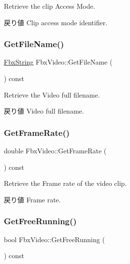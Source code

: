 Retrieve the clip Access Mode. \begin{DoxyReturn}{戻り値}
Clip access mode identifier. 
\end{DoxyReturn}
\mbox{\label{class_fbx_video_a96fc2a11e4e7ca89230389bb55ca5466}} 
\subsubsection{\texorpdfstring{Get\+File\+Name()}{GetFileName()}}
{\footnotesize\ttfamily \hyperlink{class_fbx_string}{Fbx\+String} Fbx\+Video\+::\+Get\+File\+Name (\begin{DoxyParamCaption}{ }\end{DoxyParamCaption}) const}

Retrieve the Video full filename. \begin{DoxyReturn}{戻り値}
Video full filename. 
\end{DoxyReturn}
\mbox{\label{class_fbx_video_afa17b30dbcff2e23fe507585e2688619}} 
\subsubsection{\texorpdfstring{Get\+Frame\+Rate()}{GetFrameRate()}}
{\footnotesize\ttfamily double Fbx\+Video\+::\+Get\+Frame\+Rate (\begin{DoxyParamCaption}{ }\end{DoxyParamCaption}) const}

Retrieve the Frame rate of the video clip. \begin{DoxyReturn}{戻り値}
Frame rate. 
\end{DoxyReturn}
\mbox{\label{class_fbx_video_a47eacfcc9760e1b014cc706795e267fd}} 
\subsubsection{\texorpdfstring{Get\+Free\+Running()}{GetFreeRunning()}}
{\footnotesize\ttfamily bool Fbx\+Video\+::\+Get\+Free\+Running (\begin{DoxyParamCaption}{ }\end{DoxyParamCaption}) const}

